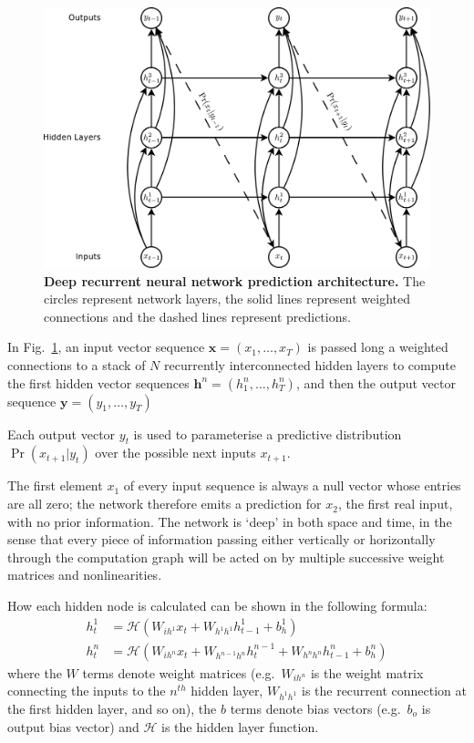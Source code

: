 \documentclass{article} %
\newcommand{\fref}[1]{Fig.~\ref{fig:#1}}
\newcommand{\flabel}[1]{\label{fig:#1}}
\begin{document}
\begin{figure}[h]
\begin{center}
\includegraphics[scale = 0.3]{deep_predictor.pdf}
\caption{\textbf{Deep recurrent neural network prediction architecture.} The circles represent network layers, the solid lines represent weighted connections
and the dashed lines represent predictions. }
\flabel{deep_predictor}
\end{center}
\end{figure}

In \fref{deep_predictor}, an input vector sequence $\mathbf{x}=(x_1, \ldots, x_T)$ is passed long a weighted connections to a stack of $N$ recurrently interconnected hidden layers to compute the first hidden vector sequences $\mathbf{h}^n = (h^n_1,\ldots,h^n_T)$, and then the output vector sequence $\mathbf{y} = (y_1, \ldots, y_T)$

Each output vector $y_t$ is used to parameterise a predictive distribution $\Pr(x_{t+1}|y_t)$ over the possible next inputs $x_{t+1}$.

The first element $x_1$ of every input sequence is always a null vector whose entries are all zero; the network therefore emits a prediction for $x_2$, the first real input, with no prior information.
The network is `deep' in both space and time, in the sense that every piece of information passing either vertically or horizontally through the computation graph will be acted on by multiple successive weight matrices and nonlinearities.

How each hidden node is calculated can be shown in the following formula: 
\begin{align}
\label{eq:pred_hidden}
h^1_t &= \mathcal{H}\left(W_{i h^1} x_t + W_{h^{1}h^{1}} h^1_{t-1} + b_{h}^1 \right)\\
h^n_t &= \mathcal{H}\left(W_{i h^n} x_t + W_{h^{n-1}h^{n}} h^{n-1}_t + W_{h^{n}h^{n}} h^n_{t-1} + b_h^n \right)
\end{align} 
where the $W$ terms denote weight matrices (e.g.\ $W_{i h^n}$ is the weight matrix connecting the inputs to the $n^{th}$ hidden layer, $W_{h^{1}h^{1}}$ is the recurrent connection at the first hidden layer, and so on), the $b$ terms denote bias vectors (e.g.\ $b_o$ is output bias vector) and $\mathcal{H}$ is the hidden layer function. 
\end{document}
